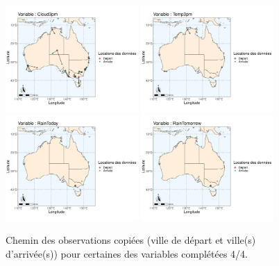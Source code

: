 \documentclass{article}
\begin{document}
\begin{figure}[htp]
    \centering
    \includegraphics[width=0.45\textwidth]{Images/Australia_map_segments_complete/Australia_map_segments_complete-13.png}
    \includegraphics[width=0.45\textwidth]{Images/Australia_map_segments_complete/Australia_map_segments_complete-14.png}
    \includegraphics[width=0.45\textwidth]{Images/Australia_map_segments_complete/Australia_map_segments_complete-15.png}
    \includegraphics[width=0.45\textwidth]{Images/Australia_map_segments_complete/Australia_map_segments_complete-16.png}
    \caption{Chemin des observations copiées (ville de départ et ville(s) d'arrivée(s)) pour certaines des variables complétées 4/4.}
    \label{fig:path_data4}
\end{figure}
\end{document}
